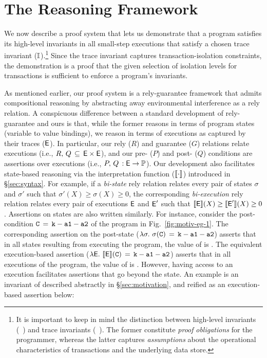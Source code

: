 \section{The Reasoning Framework}
\label{sec:reasoning}

We now describe a proof system that lets us demonstrate that a \txnimp
program satisfies its high-level invariants in all small-step
executions that satisfy a chosen trace invariant ($\mathbb{I}$).\footnote{It is
important to keep in mind the distinction between high-level invariants
(\eg~) and trace invariants (\eg~). The former
constitute \emph{proof} \emph{obligations} for the programmer, whereas
the latter captures \emph{assumptions} about the operational characteristics
of transactions and the underlying data store. } 
Since the trace invariant captures transaction-isolation constraints,
the demonstration is a proof that the given selection of isolation
levels for transactions is sufficient to enforce a program's invariants.

As mentioned earlier, our proof system is a rely-guarantee framework
that admits compositional reasoning by abstracting away environmental
interference as a rely relation. A conspicuous difference between a
standard development of rely-guarantee and ours is that, while the
former reasons in terms of program states (variable to value
bindings), we reason in terms of executions as captured by their
traces ($\textsf{E}$). In particular, our rely ($R$) and guarantee ($G$)
relations relate executions (i.e., $R,\,Q\,\subseteq\,\textsf{E}\times\textsf{E}$),
and our pre- ($P$) and post- ($Q$) conditions are assertions over
executions (i.e., $P,\,Q\, : \textsf{E} \rightarrow \mathbb{P}$). Our development
also facilitates state-based reasoning via the interpretation function
($\llbracket \cdot \rrbracket$) introduced in \S\ref{sec:syntax}. For example, if a
\emph{bi-state} rely relation relates every pair of states $\sigma$
and $\sigma'$ such that $\sigma'(X) \ge \sigma(X) \ge 0$, the
corresponding \emph{bi-execution} rely relation relates every pair of
executions $\textsf{E}$ and $\textsf{E}'$ such that $\llbracket \textsf{E} \rrbracket(X) \ge
\llbracket \textsf{E}' \rrbracket(X) \ge 0$.  Assertions on states are also written
similarly. For instance, consider the post-condition
${\tt C\,=\,k-a1-a2}$ of the program in Fig.~\ref{fig:motiv-eg-1}. The
corresponding assertion on the post-state
($\lambda\sigma.~\sigma({\tt C}) \,=\, {\tt k-a1-a2}$) asserts that in all
states resulting from executing the program, the value of  is
. The equivalent execution-based assertion
($\lambda\textsf{E}.~\llbracket \textsf{E} \rrbracket({\tt C})\,=\,{\tt k-a1-a2}$) asserts that in all
executions of the program, the value of  is .
However, having access to an execution facilitates assertions that go
beyond the state. An example is an invariant of  described
abstractly in \S\ref{sec:motivation}, and reified as an
execution-based assertion below:

